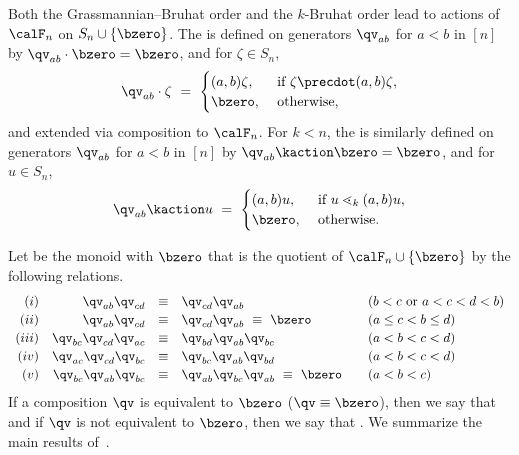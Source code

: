 Both the Grassmannian--Bruhat order and the $k$-Bruhat order lead to actions of~$\calF_n$ on $S_n\cup\{\bzero\}$.
The  is defined on generators $\qv_{ab}$ for $a<b$ in $[n]$ by $\qv_{ab}\cdot\bzero=\bzero$, and for
$\zeta\in S_n$, 
\begin{equation*}
   \qv_{ab} \cdot \zeta\ =\ \begin{cases}
            (a,b) \zeta, & \text{ if }\zeta\precdot (a,b)\zeta,\\
            \bzero,& \text{ otherwise,}
       \end{cases}
\end{equation*}
and extended via composition to $\calF_n$.
For $k< n$, the  is similarly defined  on generators $\qv_{ab}$ for
$a<b$ in $[n]$ by $\qv_{ab}\kaction\bzero=\bzero$, and for $u\in S_n$,
\begin{equation*}
   \qv_{ab}\kaction u\ =\ \begin{cases}
            (a,b) u, & \text{ if }u \lessdot_k (a,b)u,\\
            \bzero,& \text{ otherwise.}
       \end{cases}
\end{equation*}

Let  be the monoid with $\bzero$ that is the quotient of $\calF_n\cup\{\bzero\}$ by the
following relations.
\begin{equation}
    \label{Eq:monoid-relations}
    \begin{array}{rrclll}
        (i)   & \qv_{ab}\qv_{cd}           & \equiv & \qv_{cd}\qv_{ab}                     &  & \text{($b<c$ or $a<c<d<b$)} \\ [0.5ex]
        (ii)  & \qv_{ab}\qv_{cd}           & \equiv & \qv_{cd}\qv_{ab}\ \equiv\ \bzero     &  & \text{($a\leq c<b\leq d$)}  \\ [0.5ex]
        (iii) & \qv_{bc}\qv_{cd}\qv_{ac} & \equiv & \qv_{bd}\qv_{ab}\qv_{bc}                 &  & \text{($a<b<c<d$)}          \\ [0.5ex]
        (iv)  & \qv_{ac}\qv_{cd}\qv_{bc} & \equiv & \qv_{bc}\qv_{ab}\qv_{bd}                 &  & \text{($a<b<c<d$)}          \\ [0.5ex]
        (v)   & \qv_{bc}\qv_{ab}\qv_{bc} & \equiv & \qv_{ab}\qv_{bc}\qv_{ab}\ \equiv\ \bzero &  & \text{($a<b<c$)}
    \end{array}
\end{equation}
If a composition  $\qv$ is equivalent to $\bzero$ ($\qv\equiv\bzero$), then we say that  and
if $\qv$ is not equivalent to $\bzero$, then we say that .
We summarize the main results of~\cite{BS-Monoid}.

